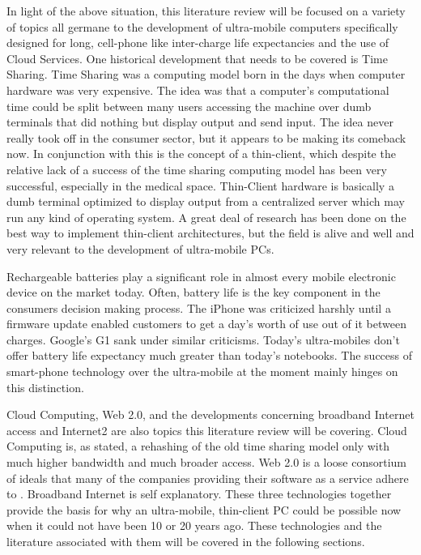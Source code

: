 In light of the above situation, this literature review will be focused on a
variety of topics all germane to the development of ultra-mobile computers
specifically designed for long, cell-phone like inter-charge life expectancies
and the use of Cloud Services.  One historical development that needs to be
covered is Time Sharing.  Time Sharing was a computing model born in the days
when computer hardware was very expensive.  The idea was that a computer's
computational time could be split between many users accessing the machine over
dumb terminals that did nothing but display output and send input.  The idea
never really took off in the consumer sector, but it appears to be making its
comeback now.  In conjunction with this is the concept of a thin-client, which
despite the relative lack of a success of the time sharing computing model has
been very successful, especially in the medical space.  Thin-Client hardware is
basically a dumb terminal optimized to display output from a centralized server
which may run any kind of operating system.  A great deal of research has been
done on the best way to implement thin-client architectures, but the field is
alive and well and very relevant to the development of ultra-mobile PCs.

Rechargeable batteries play a significant role in almost every mobile electronic
device on the market today.  Often, battery life is the key component in the
consumers decision making process.  The iPhone was criticized harshly until a
firmware update enabled customers to get a day's worth of use out of it between
charges.  Google's G1 sank under similar criticisms.  Today's ultra-mobiles
don't offer battery life expectancy much greater than today's notebooks.  The
success of smart-phone technology over the ultra-mobile at the moment mainly
hinges on this distinction.

Cloud Computing, Web 2.0, and the developments concerning broadband Internet
access and Internet2 are also topics this literature review will be covering.
Cloud Computing is, as stated, a rehashing of the old time sharing model only
with much higher bandwidth and much broader access.  Web 2.0 is a loose
consortium of ideals that many of the companies providing their software as a
service adhere to \citep{oreilly2007}.  Broadband Internet is self explanatory.
These three technologies together provide the basis for why an ultra-mobile,
thin-client PC could be possible now when it could not have been 10 or 20 years
ago.  These technologies and the literature associated with them will be covered
in the following sections.

